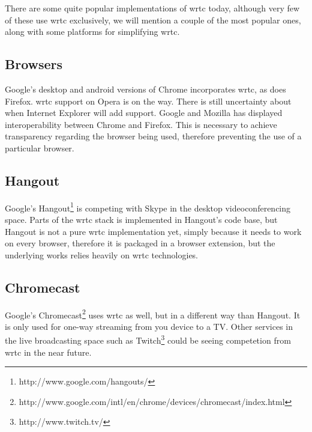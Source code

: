 
There are some quite popular implementations of \gls{wrtc} today, although very few of these use \gls{wrtc} exclusively, we will mention a couple of the most popular ones, along with some platforms for simplifying \gls{wrtc}.

\subsection{Browsers}
Google's desktop and android versions of Chrome incorporates \gls{wrtc}, as does Firefox. \gls{wrtc} support on Opera is on the way. There is still uncertainty about when Internet Explorer will add support. Google and Mozilla has displayed interoperability between Chrome and Firefox. This is necessary to achieve transparency regarding the browser being used, therefore preventing the use of a particular browser. 

\subsection{Hangout}
Google's Hangout\footnote{http://www.google.com/hangouts/} is competing with Skype in the desktop videoconferencing space. Parts of the \gls{wrtc} stack is implemented in Hangout's code base, but Hangout is not a pure \gls{wrtc} implementation yet, simply because it needs to work on every browser, therefore it is packaged in a browser extension, but the underlying works relies heavily on \gls{wrtc} technologies.

\subsection{Chromecast}
Google's Chromecast\footnote{http://www.google.com/intl/en/chrome/devices/chromecast/index.html} uses \gls{wrtc} as well, but in a different way than Hangout. It is only used for one-way streaming from you device to a TV. Other services in the live broadcasting space such as Twitch\footnote{http://www.twitch.tv/} could be seeing competetion from \gls{wrtc} in the near future.

